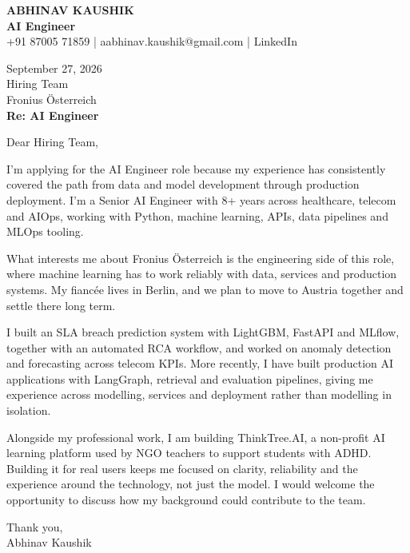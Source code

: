 \documentclass[10pt,a4paper]{article}
\begin{document}
\begin{center}
{\Large\bfseries ABHINAV KAUSHIK}\\[2pt]
{\bfseries AI Engineer}\\[2pt]
+91 87005 71859 \quad | \quad aabhinav.kaushik@gmail.com \quad | \quad LinkedIn
\end{center}
\vspace{8pt}
September 27, 2026\\[6pt]
Hiring Team\\
Fronius Österreich\\[4pt]
\textbf{Re: AI Engineer}

Dear Hiring Team,

I’m applying for the AI Engineer role because my experience has consistently covered the path from data and model development through production deployment. I’m a Senior AI Engineer with 8+ years across healthcare, telecom and AIOps, working with Python, machine learning, APIs, data pipelines and MLOps tooling.

What interests me about Fronius Österreich is the engineering side of this role, where machine learning has to work reliably with data, services and production systems. My fiancée lives in Berlin, and we plan to move to Austria together and settle there long term.

I built an SLA breach prediction system with LightGBM, FastAPI and MLflow, together with an automated RCA workflow, and worked on anomaly detection and forecasting across telecom KPIs. More recently, I have built production AI applications with LangGraph, retrieval and evaluation pipelines, giving me experience across modelling, services and deployment rather than modelling in isolation.

Alongside my professional work, I am building ThinkTree.AI, a non-profit AI learning platform used by NGO teachers to support students with ADHD. Building it for real users keeps me focused on clarity, reliability and the experience around the technology, not just the model. I would welcome the opportunity to discuss how my background could contribute to the team.

Thank you,\\
Abhinav Kaushik
\end{document}
